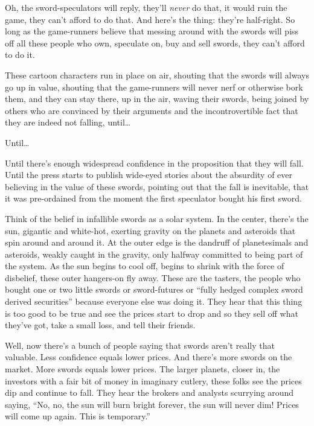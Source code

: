 Oh, the sword-speculators will reply, they'll \emph{never} do that,
it would ruin the game, they can't afford to do that. And here's
the thing: they're half-right. So long as the game-runners believe
that messing around with the swords will piss off all these people
who own, speculate on, buy and sell swords, they can't afford to do
it.

These cartoon characters run in place on air, shouting that the
swords will always go up in value, shouting that the game-runners
will never nerf or otherwise bork them, and they can stay there, up
in the air, waving their swords, being joined by others who are
convinced by their arguments and the incontrovertible fact that
they are indeed not falling, until\ldots{}

Until\ldots{}

Until there's enough widespread confidence in the proposition that
they will fall. Until the press starts to publish wide-eyed stories
about the absurdity of ever believing in the value of these swords,
pointing out that the fall is inevitable, that it was pre-ordained
from the moment the first speculator bought his first sword.

Think of the belief in infallible swords as a solar system. In the
center, there's the sun, gigantic and white-hot, exerting gravity
on the planets and asteroids that spin around and around it. At the
outer edge is the dandruff of planetesimals and asteroids, weakly
caught in the gravity, only halfway committed to being part of the
system. As the sun begins to cool off, begins to shrink with the
force of disbelief, these outer hangers-on fly away. These are the
tasters, the people who bought one or two little swords or
sword-futures or ``fully hedged complex sword derived securities''
because everyone else was doing it. They hear that this thing is
too good to be true and see the prices start to drop and so they
sell off what they've got, take a small loss, and tell their
friends.

Well, now there's a bunch of people saying that swords aren't
really that valuable. Less confidence equals lower prices. And
there's more swords on the market. More swords equals lower prices.
The larger planets, closer in, the investors with a fair bit of
money in imaginary cutlery, these folks see the prices dip and
continue to fall. They hear the brokers and analysts scurrying
around saying, ``No, no, the sun will burn bright forever, the sun
will never dim! Prices will come up again. This is temporary.''


